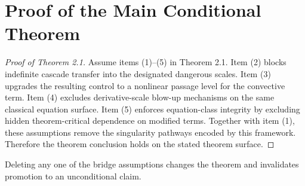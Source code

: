 \section{Proof of the Main Conditional Theorem}

\begin{proof}[Proof of Theorem 2.1]
Assume items (1)--(5) in Theorem 2.1. Item (2) blocks indefinite cascade transfer into the designated dangerous scales. Item (3) upgrades the resulting control to a nonlinear passage level for the convective term. Item (4) excludes derivative-scale blow-up mechanisms on the same classical equation surface. Item (5) enforces equation-class integrity by excluding hidden theorem-critical dependence on modified terms. Together with item (1), these assumptions remove the singularity pathways encoded by this framework. Therefore the theorem conclusion holds on the stated theorem surface.
\end{proof}

\begin{remark}
Deleting any one of the bridge assumptions changes the theorem and invalidates promotion to an unconditional claim.
\end{remark}
